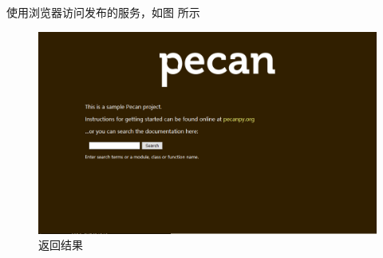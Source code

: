 使用浏览器访问发布的服务，如图 所示
\begin{figure}[H]
  \centering
  \includegraphics[width=\linewidth]{quickstart.png}
  \caption{返回结果}
  \label{fig:quickstart}
\end{figure}

